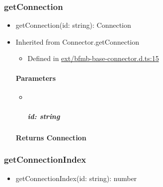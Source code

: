 \documentclass[]{article}
\providecommand{\tightlist}{%
  \setlength{\itemsep}{0pt}\setlength{\parskip}{0pt}}
\let\oldparagraph\paragraph
\renewcommand{\paragraph}[1]{\oldparagraph{#1}\mbox{}}
\let\oldsubparagraph\subparagraph
\renewcommand{\subparagraph}[1]{\oldsubparagraph{#1}\mbox{}}
\begin{document}
\protect\hypertarget{getconnection}{}{}

\hypertarget{getconnection}{%
\subsubsection{getConnection}\label{getconnection}}

\begin{itemize}
\tightlist
\item
  getConnection{(}id{: }{string}{)}{: }{Connection}
\end{itemize}

\begin{itemize}
\item
  Inherited from Connector.getConnection

  \begin{itemize}
  \tightlist
  \item
    Defined in
    \href{https://github.com/BFMBFramework/TadoConnector/blob/f05932b/src/ext/bfmb-base-connector.d.ts\#L15}{ext/bfmb-base-connector.d.ts:15}
  \end{itemize}

  \hypertarget{parameters-3}{%
  \paragraph{Parameters}\label{parameters-3}}

  \begin{itemize}
  \item ~
    \hypertarget{id-string}{%
    \subparagraph{\texorpdfstring{id:
    {string}}{id: string}}\label{id-string}}
  \end{itemize}

  \hypertarget{returns-connection}{%
  \paragraph{\texorpdfstring{Returns
  {Connection}}{Returns Connection}}\label{returns-connection}}
\end{itemize}

\protect\hypertarget{getconnectionindex}{}{}

\hypertarget{getconnectionindex}{%
\subsubsection{getConnectionIndex}\label{getconnectionindex}}

\begin{itemize}
\tightlist
\item
  getConnectionIndex{(}id{: }{string}{)}{: }{number}
\end{itemize}
\end{document}

